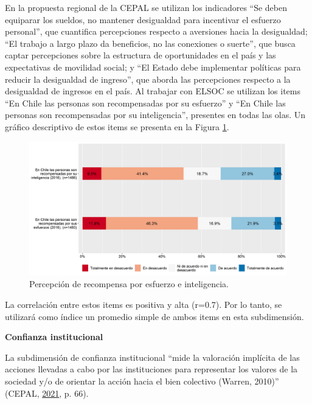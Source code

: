 \documentclass[
  12pt,
]{book}
\begin{document}
En la propuesta regional de la CEPAL se utilizan los indicadores ``Se deben equiparar los sueldos, no mantener desigualdad para incentivar el esfuerzo personal'', que cuantifica percepciones respecto a aversiones hacia la desigualdad; ``El trabajo a largo plazo da beneficios, no las conexiones o suerte'', que busca captar percepciones sobre la estructura de oportunidades en el país y las expectativas de movilidad social; y ``El Estado debe implementar políticas para reducir la desigualdad de ingreso'', que aborda las percepciones respecto a la desigualdad de ingresos en el país. Al trabajar con ELSOC se utilizan los items ``En Chile las personas son recompensadas por su esfuerzo'' y ``En Chile las personas son recompensadas por su inteligencia'', presentes en todas las olas. Un gráfico descriptivo de estos items se presenta en la Figura \ref{fig:justicia}.

\begin{figure}[H]

{\centering \includegraphics[width=1\linewidth,height=1\textheight]{output/graphs/justicia} 

}

\caption{Percepción de recompensa por esfuerzo e inteligencia.}\label{fig:justicia}
\end{figure}

La correlación entre estos items es positiva y alta (r=0.7). Por lo tanto, se utilizará como índice un promedio simple de ambos items en esta subdimensión.

\textbf{Confianza institucional}

La subdimensión de confianza institucional ``mide la valoración implícita de las acciones llevadas a cabo por las instituciones para representar los valores de la sociedad y/o de orientar la acción hacia el bien colectivo (Warren, 2010)'' (CEPAL, \protect\hyperlink{ref-cepal_cohesion_2021}{2021}, p. 66).
\end{document}

